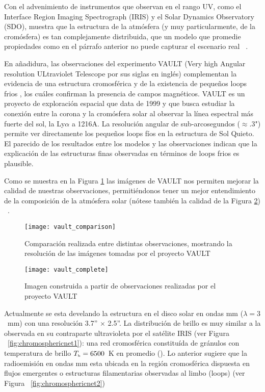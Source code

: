 Con el advenimiento de instrumentos que observan en el rango UV, como el Interface Region Imaging Spectrograph (IRIS) y el Solar Dynamics Observatory (SDO), muestra que la estructura de la atm\'osfera (y muy particularmente, de la crom\'osfera) es tan complejamente distribuida, que un modelo que promedie propiedades como en el p\'arrafo anterior no puede capturar el escenario real ~\citep{VAULT1}. 

En a\~nadidura, las  observaciones del experimento VAULT (Very high Angular resolution ULtraviolet Telescope por sus siglas en ingl\'es) complementan la evidencia de una estructura cromosf\'erica y de la existencia de peque\~nos loops frios \citep{VAULT1}, los cu\'ales confirman la presencia de campos magn\'eticos.
VAULT es un proyecto de exploraci\'on espacial que data de 1999 y que busca estudiar la conexi\'on entre la corona y la crom\'osfera solar al observar la l\'inea espectral m\'as fuerte del sol, la Ly$\alpha$ a 1216A.
La resoluci\'on angular de sub-arcosegundos ($\approx$.3") permite ver directamente los peque\~nos loops f\'ios en la estructura de Sol Quieto. El parecido de los resultados entre los modelos y las observaciones indican que la explicaci\'on de las estructuras finas observadas en t\'erminos de loops frios es plausible.

Como se muestra en la Figura \ref{fig:vault_compare} las im\'agenes de VAULT nos permiten mejorar la calidad de nuestras observaciones, permiti\'endonos tener un mejor entendimiento de la composici\'on de la atm\'osfera solar (n\'otese tambi\'en la calidad de la Figura \ref{fig:vault_complete}) ~\citep{VAULT1}.

\begin{figure}[ht]
\centering
\texttt{[image: vault\_comparison]}
\caption{Comparaci\'on realizada entre distintas observaciones, mostrando la resoluci\'on de las im\'agenes tomadas por el proyecto VAULT}
\label{fig:vault_compare}
\end{figure}

\begin{figure}[ht]
\centering
\texttt{[image: vault\_complete]}
\caption{Imagen construida a partir de observaciones realizadas por el proyecto VAULT}
\label{fig:vault_complete}
\end{figure}

Actualmente se esta develando la estructura en el disco solar en ondas mm ($\lambda=3$~mm) con una resoluci\'on 3.7'' $\times$ 2.5''\citep{2018A&A...619L...6N}. La distribuci\'on de brillo es muy similar a la observada en su contraparte ultravioleta por el sat\'elite IRIS (ver Figura ~\ref{fig:chromosphericnet1}): una red cromosf\'erica constitu\'ida de gr\'anulos con temperatura de brillo $T_{\tiny{\mbox{b}}}=6500$~K en promedio (\citep{2018A&A...619L...6N}). Lo anterior sugiere que la radioemisi\'on en ondas mm esta  ubicada en la regi\'on cromosf\'erica dispuesta en flujos emergentes o estructuras filamentarias observadas al limbo (loops) (ver Figura ~\ref{fig:chromosphericnet2})

